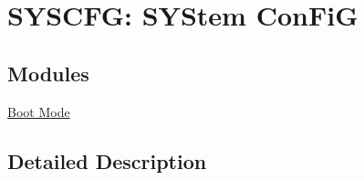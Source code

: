 \hypertarget{group___s_y_s_c_f_g___constants}{\section{S\-Y\-S\-C\-F\-G\-: S\-Y\-Stem Con\-Fi\-G}
\label{group___s_y_s_c_f_g___constants}
}
\subsection*{Modules}
\begin{DoxyCompactItemize}
\item 
\hyperlink{group___s_y_s_c_f_g___boot_mode}{Boot Mode}
\end{DoxyCompactItemize}


\subsection{Detailed Description}
